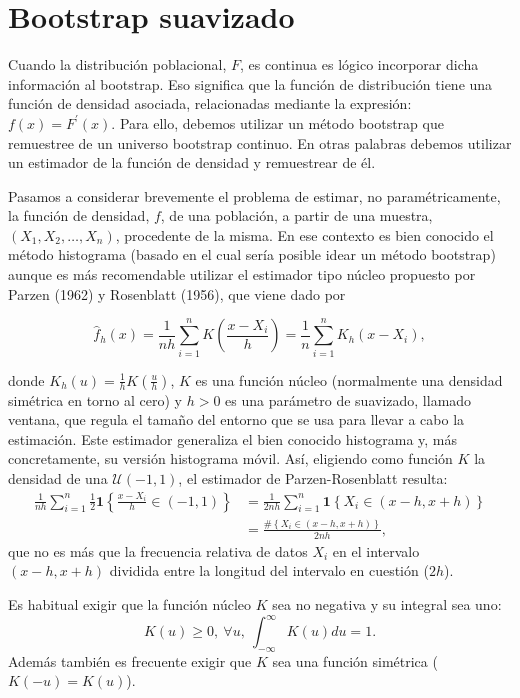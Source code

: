 \documentclass[]{book}
\theoremstyle{definition}
\theoremstyle{definition}
\theoremstyle{definition}
\theoremstyle{remark}
\begin{document}
\section{Bootstrap suavizado}\label{cap4-boot-suav}

Cuando la distribución poblacional, \(F\), es continua es lógico
incorporar dicha información al bootstrap. Eso significa que la función
de distribución tiene una función de densidad asociada, relacionadas
mediante la expresión:
\(f\left( x \right) =F^{\prime}\left( x \right)\). Para ello, debemos
utilizar un método bootstrap que remuestree de un universo bootstrap
continuo. En otras palabras debemos utilizar un estimador de la función
de densidad y remuestrear de él.

Pasamos a considerar brevemente el problema de estimar, no
paramétricamente, la función de densidad, \(f\), de una población, a
partir de una muestra, \(\left( X_1,X_2,\ldots ,X_n \right)\),
procedente de la misma. En ese contexto es bien conocido el método
histograma (basado en el cual sería posible idear un método bootstrap)
aunque es más recomendable utilizar el estimador tipo núcleo propuesto
por Parzen (1962) y Rosenblatt (1956), que viene dado por

\[\hat{f}_{h}\left( x \right) =\frac{1}{nh}\sum_{i=1}^{n}K\left( \frac{x-X_i}{
h} \right) =\frac{1}{n}\sum_{i=1}^{n}K_{h}\left( x-X_i \right),\]

donde \(K_{h}\left( u \right) =\frac{1}{h}K\left( \frac{u}{h} \right)\),
\(K\) es una función núcleo (normalmente una densidad simétrica en torno
al cero) y \(h>0\) es una parámetro de suavizado, llamado ventana, que
regula el tamaño del entorno que se usa para llevar a cabo la
estimación. Este estimador generaliza el bien conocido histograma y, más
concretamente, su versión histograma móvil. Así, eligiendo como función
\(K\) la densidad de una \(\mathcal{U}\left( -1,1 \right)\), el
estimador de Parzen-Rosenblatt resulta: \[\begin{aligned}
\frac{1}{nh}\sum_{i=1}^{n}\frac{1}{2}\mathbf{1}\left\{ \frac{x-X_i}{h}\in
\left( -1,1 \right) \right\} &= \frac{1}{2nh}\sum_{i=1}^{n}\mathbf{1}\left\{
X_i\in \left( x-h,x+h \right) \right\} \\
&= \frac{\#\left\{ X_i\in \left( x-h,x+h \right) \right\} }{2nh},
\end{aligned}\] que no es más que la frecuencia relativa de datos
\(X_i\) en el intervalo \(\left( x-h,x+h \right)\) dividida entre la
longitud del intervalo en cuestión (\(2h\)).

Es habitual exigir que la función núcleo \(K\) sea no negativa y su
integral sea uno:
\[K\left( u \right) \geq 0,~\forall u,~\int_{-\infty }^{\infty }K\left(u \right) du=1.\]
Además también es frecuente exigir que \(K\) sea una función simétrica
(\(K\left( -u \right) =K\left( u \right)\)).
\end{document}
